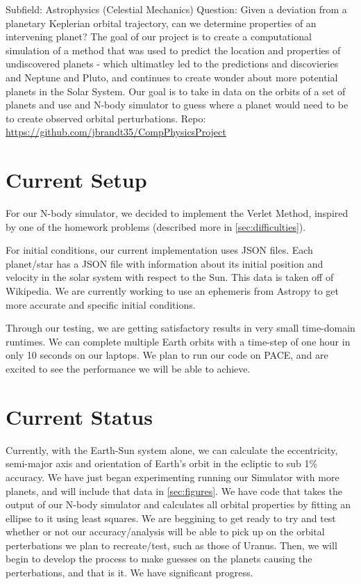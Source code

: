 \documentclass[a4paper,12pt]{article} %
\numberwithin{equation}{section} %
\numberwithin{figure}{section} %
\begin{document}
Subfield: Astrophysics (Celestial Mechanics) \newline
Question: Given a deviation from a planetary Keplerian orbital trajectory, can we determine properties of an intervening planet? \newline
The goal of our project is to create a computational simulation of a method that was used to predict the location and properties of undiscovered planets - which ultimatley led to the predictions and discovieries and Neptune and Pluto, and continues to create wonder about more potential planets in the Solar System. Our goal is to take in data on the orbits of a set of planets and use and N-body simulator to guess where a planet would need to be to create observed orbital perturbations. \newline
Repo: \url{https://github.com/jbrandt35/CompPhysicsProject}

\section{Current Setup}

For our N-body simulator, we decided to implement the Verlet Method, inspired by one of the homework problems (described more in \ref{sec:difficulties}). \par
For initial conditions, our current implementation uses JSON files. Each planet/star has a JSON file with information about its initial position and velocity in the solar system with respect to the Sun. This data is taken off of Wikipedia. We are currently working to use an ephemeris from Astropy to get more accurate and specific initial conditions. \par
Through our testing, we are getting satisfactory results in very small time-domain runtimes. We can complete multiple Earth orbits with a time-step of one hour in only 10 seconds on our laptops. We plan to run our code on PACE, and are excited to see the performance we will be able to achieve.



\section{Current Status}

Currently, with the Earth-Sun system alone, we can calculate the eccentricity, semi-major axis and orientation of Earth's orbit in the ecliptic to sub 1\% accuracy. We have just began experimenting running our Simulator with more planets, and will include that data in \ref{sec:figures}. We have code that takes the output of our N-body simulator and calculates all orbital properties by fitting an ellipse to it using least squares. We are beggining to get ready to try and test whether or not our accuracy/analysis will be able to pick up on the orbital perterbations we plan to recreate/test, such as those of Uranus. Then, we will begin to develop the process to make guesses on the planets causing the perterbations, and that is it. We have significant progress.
\end{document}
